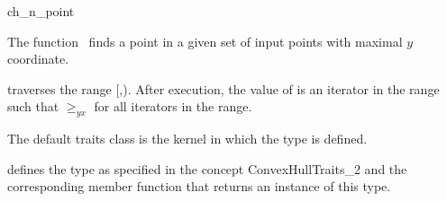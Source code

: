 

\begin{ccRefFunction}{ch_n_point}  %

\ccDefinition
  
The function \ccRefName\ finds a point in a given set  
of input points with maximal $y$ coordinate.


           {traverses the range [,).
            After execution, the value of
             is an iterator in the range such that  $\ge_{yx}$
             for all iterators  in the range.}


The default traits class  is the kernel in which the type
 is defined.

 defines the type  as specified in
the concept ConvexHullTraits\_2 and the corresponding member
function that returns an instance of this type.


\ccSeeAlso

 \\
 \\
 \\
 \\
 \\

\end{ccRefFunction}


